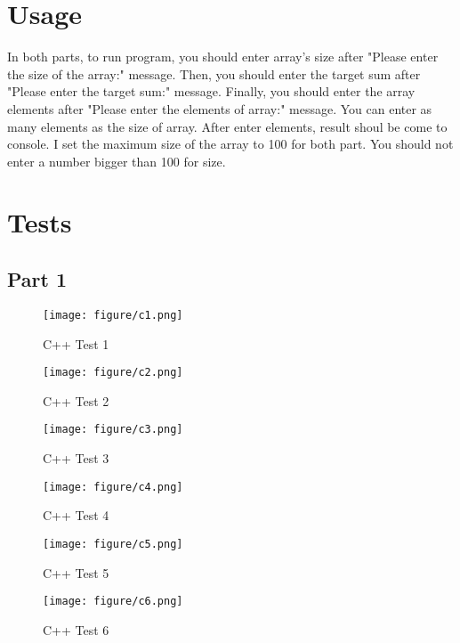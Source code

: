 \documentclass[twoside,11pt]{article}
\begin{document}
\section{Usage} 
\label{sec:background}

In both parts, to run program, you should enter array's size after "Please enter the size of the array:" message. Then, you should enter the target sum after "Please enter the target sum:" message. Finally, you should enter the array elements after "Please enter the elements of array:" message. You can enter as many elements as the size of array. After enter elements, result shoul be come to console. I set the maximum size of the array to 100 for both part. You should not enter a number bigger than 100 for size.

\newpage

\section{Tests} 
\label{sec:background}

\subsection{Part 1} 
\label{sec:background}

\begin{figure}[h]
\caption{C++ Test 1}
\centering
\texttt{[image: figure/c1.png]}
\end{figure}

\begin{figure}[h]
\caption{C++ Test 2}
\centering
\texttt{[image: figure/c2.png]}
\end{figure}

\begin{figure}[h]
\caption{C++ Test 3}
\centering
\texttt{[image: figure/c3.png]}
\end{figure}

\begin{figure}[h]
\caption{C++ Test 4}
\centering
\texttt{[image: figure/c4.png]}
\end{figure}

\begin{figure}[h]
\caption{C++ Test 5}
\centering
\texttt{[image: figure/c5.png]}
\end{figure}

\begin{figure}[h]
\caption{C++ Test 6}
\centering
\texttt{[image: figure/c6.png]}
\end{figure} 
\end{document}
